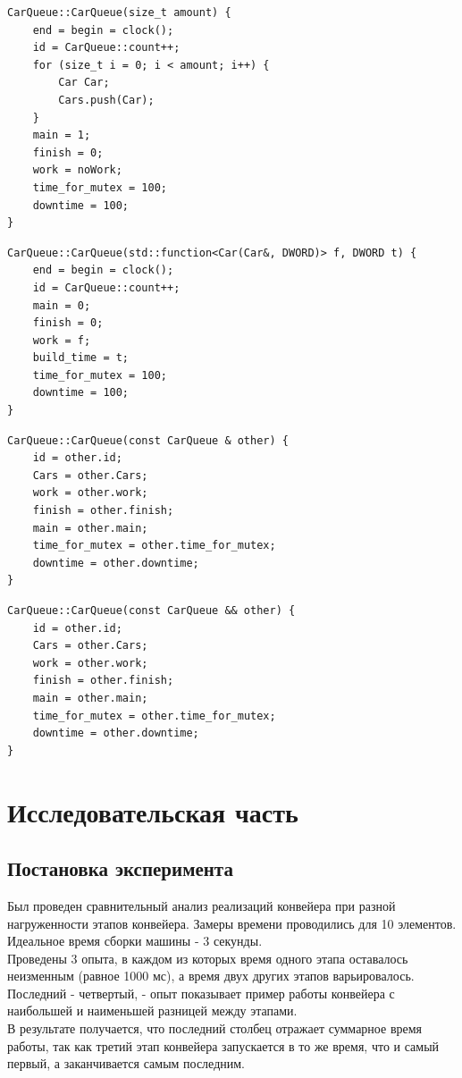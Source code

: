 \documentclass[12pt]{report}
\begin{document}
	\begin{lstlisting}[label=pf,caption=Функция CarQueue - конструктор класса для пустой очереди]
CarQueue::CarQueue(size_t amount) {
	end = begin = clock();
	id = CarQueue::count++;
	for (size_t i = 0; i < amount; i++) {
		Car Car;
		Cars.push(Car);
	}
	main = 1;
	finish = 0;
	work = noWork;
	time_for_mutex = 100;
	downtime = 100;
}
\end{lstlisting}

	\begin{lstlisting}[label=pf,caption= Конструктор класса для очереди построения компонента]
CarQueue::CarQueue(std::function<Car(Car&, DWORD)> f, DWORD t) {
	end = begin = clock();
	id = CarQueue::count++;
	main = 0;
	finish = 0;
	work = f;
	build_time = t;
	time_for_mutex = 100;
	downtime = 100;
}
\end{lstlisting}

	\begin{lstlisting}[label=pf,caption= Конструктор копирования]
CarQueue::CarQueue(const CarQueue & other) {
	id = other.id;
	Cars = other.Cars;
	work = other.work;
	finish = other.finish;
	main = other.main;
	time_for_mutex = other.time_for_mutex;
	downtime = other.downtime;
}
\end{lstlisting}

	\begin{lstlisting}[label=pf,caption=  Конструктор перемещения]
CarQueue::CarQueue(const CarQueue && other) {
	id = other.id;
	Cars = other.Cars;
	work = other.work;
	finish = other.finish;
	main = other.main;
	time_for_mutex = other.time_for_mutex;
	downtime = other.downtime;
}
\end{lstlisting}




\chapter{Исследовательская часть}

\section{Постановка эксперимента}

Был проведен сравнительный анализ реализаций конвейера при разной нагруженности этапов конвейера. Замеры времени проводились для 10 элементов. Идеальное время сборки машины - 3 секунды.\\
Проведены 3 опыта, в каждом из которых время одного этапа оставалось неизменным (равное 1000 мс), а время двух других этапов варьировалось.\\
Последний - четвертый, - опыт показывает пример работы конвейера с наибольшей и наименьшей разницей между этапами.\\
В результате получается, что последний столбец отражает суммарное время работы,  так как третий этап конвейера запускается в то же время, что и самый первый, а заканчивается самым последним.
\end{document}
